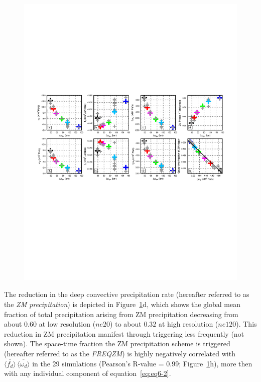 \begin{figure}[t]
\begin{center}
\noindent\includegraphics[width=33pc,angle=0]{chapter6/temp_diags_8panel.pdf}\\
\end{center}
\caption{}
\label{fig:8panel}
\end{figure}

The reduction in the \cite{ZM1995AO} deep convective precipitation rate (hereafter referred to as the {\em{ZM precipitation}}) is depicted in Figure~\ref{fig:8panel}d, which shows the global mean fraction of total precipitation arising from ZM precipitation decreasing from about $0.60$ at low resolution ($ne20$) to about $0.32$ at high resolution ($ne120$). This reduction in ZM precipitation manifest through triggering less frequently (not shown). The space-time fraction the ZM precipitation scheme is triggered (hereafter referred to as the {\em{FREQZM}}) is highly negatively correlated with $\overline{\langle f_{d} \rangle} \, \overline{\langle \omega_{d} \rangle}$ in the 29 simulations (Pearson's R-value = 0.99; Figure~\ref{fig:8panel}h), more then with any individual component of equation~\ref{eq:eq6-2}.

